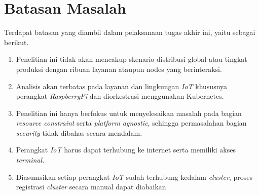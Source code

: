 \section{Batasan Masalah}
\label{sec:batasan-masalah}

Terdapat batasan yang diambil dalam pelaksanaan tugas akhir ini, yaitu sebagai berikut.

\begin{enumerate}
  \item Penelitian ini tidak akan mencakup skenario distribusi global atau tingkat produksi dengan ribuan layanan ataupun nodes yang berinteraksi.
  \item Analisis akan terbatas pada layanan dan lingkungan \textit{IoT} khususnya perangkat \textit{RaspberryPi} dan diorkestrasi menggunakan Kubernetes.
  \item Penelitian ini hanya berfokus untuk menyelesaikan masalah pada bagian \textit{resource constraint} serta \textit{platform agnostic}, sehingga permasalahan bagian \textit{security} tidak dibahas secara mendalam.
  \item Perangkat \textit{IoT} harus dapat terhubung ke internet serta memiliki akses \textit{terminal}.
  \item Diasumsikan setiap perangkat \textit{IoT} sudah terhubung kedalam \textit{cluster}, proses registrasi \textit{cluster} secara manual dapat diabaikan
\end{enumerate}

